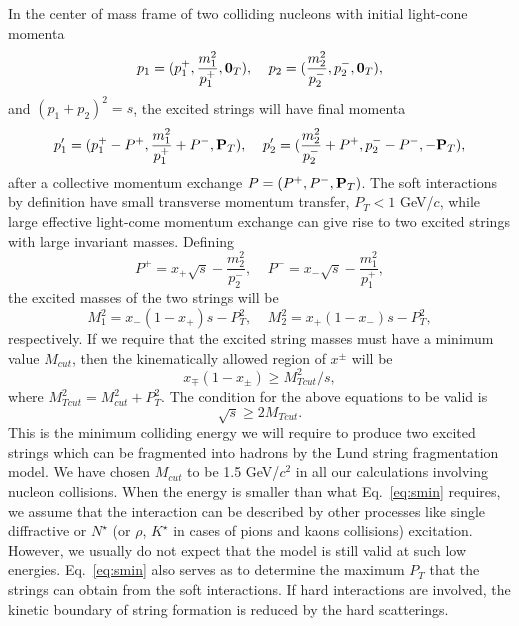         In the center of mass frame of two colliding nucleons 
with initial light-cone momenta
\begin{equation}
        p_1=(p_1^+,\frac{m_1^2}{p_1^+},{\bf 0}_T),\;\;\;\;
        p_2=(\frac{m_2^2}{p_2^-}, p_2^-,{\bf 0}_T),
\end{equation}
and $(p_1+p_2)^2=s$, the excited strings will have final
momenta
\begin{equation}
        p'_1=(p_1^+ -P^+,\frac{m_1^2}{p_1^+}+P^-, {\bf P}_T),\;\;\;\; 
        p'_2=(\frac{m_2^2}{p_2^-}+P^+, p_2^- -P^-,-{\bf P}_T),  
\end{equation}
after a collective momentum exchange $P=(P^+,P^-,{\bf P}_T)$.
The soft interactions by definition have small transverse
momentum transfer, $P_T<1$ GeV/$c$, while large effective
light-come momentum\cite{fritiof} exchange can give rise to 
two excited strings with large invariant masses. Defining 
\begin{equation}
        P^+=x_+\sqrt{s}-\frac{m_2^2}{p_2^-},\;\;\;\;
        P^-=x_-\sqrt{s}-\frac{m_1^2}{p_1^+},
\end{equation}
the excited masses of the two strings will be
\begin{equation}
        M_1^2=x_-(1-x_+)s-P_T^2, \;\;\;\; M_2^2=x_+(1-x_-)s-P_T^2,
                        \label{eq:strnms}
\end{equation}
respectively. If we require that the excited string masses must 
have a minimum value $M_{cut}$, then the kinematically 
allowed region of $x^{\pm}$ 
will be
\begin{equation}
        x_{\mp}(1-x_{\pm})\geq M_{Tcut}^2/s, \label{eq:xregn}
\end{equation}
where $M_{Tcut}^2=M_{cut}^2+P_T^2$.
The condition for the above equations to be valid is
\begin{equation}
        \sqrt{s}\geq 2M_{Tcut}. \label{eq:smin}
\end{equation}
This is the minimum colliding energy we will require to produce 
two excited strings which can be fragmented into hadrons by the 
Lund string fragmentation model. We have chosen $M_{cut}$ to be 
1.5 GeV/$c^2$ in all our calculations involving nucleon collisions. 
When the energy is smaller than what Eq.~\ref{eq:smin}
requires, we assume that the interaction can be described by 
other processes like single diffractive or $N^{\star}$ (or $\rho$, 
$K^{\star}$ in cases of pions and kaons collisions) excitation. 
However, we usually do not expect that the model is still valid 
at such low energies.  Eq.~\ref{eq:smin} also serves as to 
determine the maximum $P_T$ that the strings can obtain from 
the soft interactions. If hard interactions are  involved, 
the kinetic boundary of string formation is reduced by the
hard scatterings.

